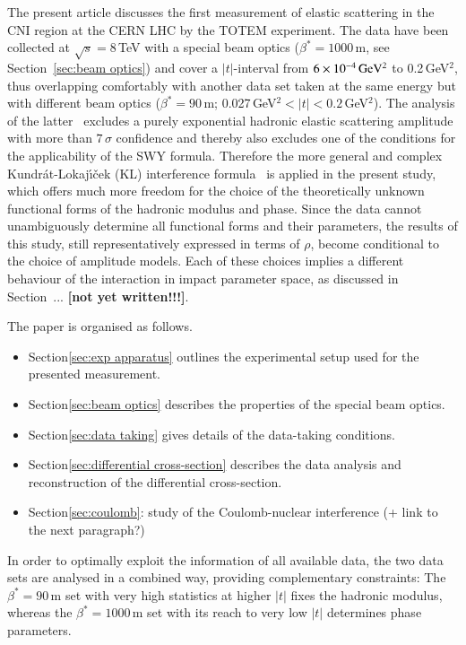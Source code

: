 The present article discusses the first measurement of elastic scattering in the
CNI region at the CERN LHC by the TOTEM experiment. 
The data have been collected at $\sqrt{s} = 8\,$TeV with a special beam optics 
($\beta^{*}=1000\,$m, see Section~\ref{sec:beam optics}) and cover a $|t|$-interval
from $6\times10^{-4}\,\rm GeV^{2}$ to 0.2\,GeV$^{2}$, thus overlapping comfortably
with another data set taken at the same energy but with different beam optics
($\beta^{*}=90\,$m; 0.027\,GeV$^{2} < |t| < 0.2\,$GeV$^{2}$). The analysis of the
latter~\cite{8tev-90m} excludes a purely exponential hadronic elastic scattering
amplitude with more than $7\,\sigma$ confidence and thereby also excludes
one of the conditions for the applicability of the SWY formula.
Therefore the more general and complex Kundr\'{a}t-Lokaj\'{\i}\v{c}ek (KL) interference 
formula~\cite{kl94} is applied in the present study, which offers much more freedom for the
choice of the theoretically unknown functional forms of the hadronic modulus 
and phase. Since the data cannot unambiguously determine all functional forms and their parameters, the results of this study, still representatively 
expressed in terms of $\rho$, become conditional to the choice of amplitude models. Each of these choices implies a different behaviour of the interaction in impact parameter space, as discussed in Section~...
\textbf{[not yet written!!!]}.




%
%

The paper is organised as follows.
\begin{itemize}
\item Section\ref{sec:exp apparatus} outlines the experimental setup used for the presented measurement.
\item Section\ref{sec:beam optics} describes the properties of the special beam optics.
\item Section\ref{sec:data taking} gives details of the data-taking conditions.
\item Section\ref{sec:differential cross-section} describes the data analysis and reconstruction of the differential cross-section.
\item Section\ref{sec:coulomb}: study of the Coulomb-nuclear interference (+ link to the next paragraph?)
\end{itemize}

In order to optimally exploit the information of all available data, the two 
data sets are analysed in a combined way, providing complementary constraints:
The $\beta^{*}=90\,$m set with very high statistics at higher $|t|$ fixes the 
hadronic modulus, whereas the $\beta^{*}=1000\,$m set with its reach to very low
$|t|$ determines phase parameters.
